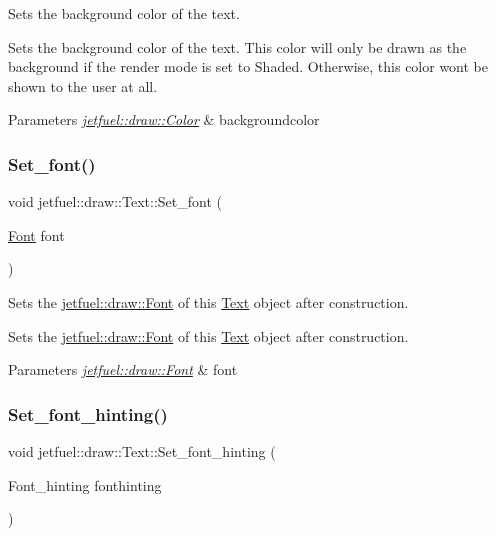 Sets the background color of the text. 

Sets the background color of the text. This color will only be drawn as the background if the render mode is set to Shaded. Otherwise, this color won\textquotesingle{}t be shown to the user at all.


\begin{DoxyParams}{Parameters}
{\em \hyperlink{classjetfuel_1_1draw_1_1Color}{jetfuel\+::draw\+::\+Color}} & backgroundcolor \\
\hline
\end{DoxyParams}
\mbox{\label{classjetfuel_1_1draw_1_1Text_a8b8f2cd4cda3d31098cc0f5535fb7f7a}} 
\subsubsection{\texorpdfstring{Set\+\_\+font()}{Set\_font()}}
{\footnotesize\ttfamily void jetfuel\+::draw\+::\+Text\+::\+Set\+\_\+font (\begin{DoxyParamCaption}\item[{\hyperlink{classjetfuel_1_1draw_1_1Font}{Font}}]{font }\end{DoxyParamCaption})}



Sets the \hyperlink{classjetfuel_1_1draw_1_1Font}{jetfuel\+::draw\+::\+Font} of this \hyperlink{classjetfuel_1_1draw_1_1Text}{Text} object after construction. 

Sets the \hyperlink{classjetfuel_1_1draw_1_1Font}{jetfuel\+::draw\+::\+Font} of this \hyperlink{classjetfuel_1_1draw_1_1Text}{Text} object after construction.


\begin{DoxyParams}{Parameters}
{\em \hyperlink{classjetfuel_1_1draw_1_1Font}{jetfuel\+::draw\+::\+Font}} & font \\
\hline
\end{DoxyParams}
\mbox{\label{classjetfuel_1_1draw_1_1Text_ada69de19f3ea2373120e37f9f61eeb6d}} 
\subsubsection{\texorpdfstring{Set\+\_\+font\+\_\+hinting()}{Set\_font\_hinting()}}
{\footnotesize\ttfamily void jetfuel\+::draw\+::\+Text\+::\+Set\+\_\+font\+\_\+hinting (\begin{DoxyParamCaption}\item[{Font\+\_\+hinting}]{fonthinting }\end{DoxyParamCaption})\hspace{0.3cm}{\ttfamily [inline]}}



